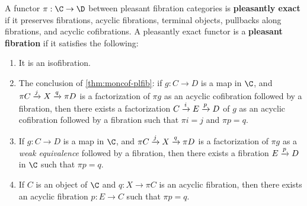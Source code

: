 \documentclass{amsart}
\begin{document}
\begin{defn}\label{def:pleasant-fib}
  A functor $\pi:\C\to\D$ between pleasant fibration categories is \textbf{pleasantly exact} if it preserves fibrations, acyclic fibrations, terminal objects, pullbacks along fibrations, and acyclic cofibrations.
  A pleasantly exact functor is a \textbf{pleasant fibration} if it satisfies the following:
  \begin{enumerate}
  \item It is an isofibration.\label{item:pf1}
  \item The conclusion of \cref{thm:moncof-plfib}: if $g:C\to D$ is a map in $\C$, and $\pi C \xrightarrow{j} X \xrightarrow{q} \pi D$ is a factorization of $\pi g$ as an acyclic cofibration followed by a fibration, then there exists a factorization $C \xrightarrow{i} E \xrightarrow{p} D$ of $g$ as an acyclic cofibration followed by a fibration such that $\pi i = j$ and $\pi p = q$.\label{item:pf2}
  \item If $g:C\to D$ is a map in $\C$, and $\pi C \xrightarrow{j} X \xrightarrow{q} \pi D$ is a factorization of $\pi g$ as a \emph{weak equivalence} followed by a fibration, then there exists a fibration $E \xrightarrow{p} D$ in $\C$ such that $\pi p = q$.\label{item:pf3}
  \item If $C$ is an object of $\C$ and $q:X\to \pi C$ is an acyclic fibration, then there exists an acyclic fibration $p:E\to C$ such that $\pi p = q$.\label{item:pf4}
  \end{enumerate}
\end{defn}
\end{document}

